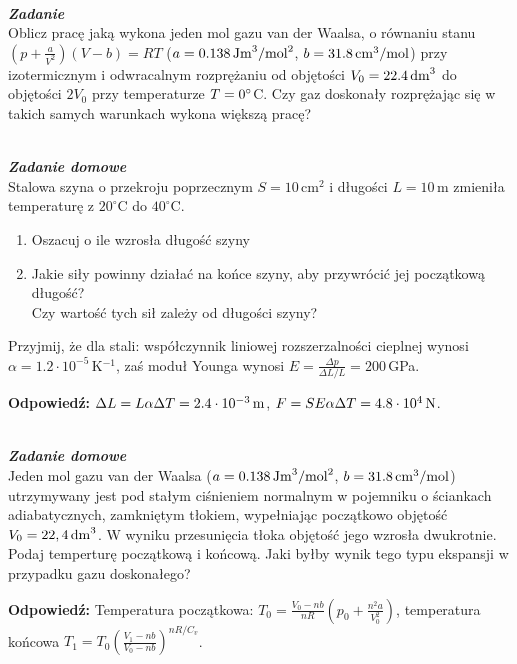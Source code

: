 \documentclass[11pt,a4paper]{article}
\newcounter{zadanie}\newcommand{\zadanie}[1][]{\addtocounter{zadanie}{1} ~\\  {\bf \emph{Zadanie \arabic{zadanie} #1 }} \\}
\newcounter{zaddom}\newcommand{\zaddom}[1][]{\addtocounter{zaddom}{1} ~\\  {\bf \emph{Zadanie domowe \arabic{zaddom} #1 }} \\}
\renewcommand{\t}[1]{\textrm{#1}}
\begin{document}
\vskip 10pt

\zadanie
Oblicz pracę jaką wykona jeden mol gazu van der Waalsa, o równaniu stanu
$(p+\frac{a}{V^2})(V-b)=RT$
($a=0.138\,\rm{Jm}^3/\rm{mol}^2$, $b=31.8\,\rm{cm^3/mol}$)
przy izotermicznym i odwracalnym rozprężaniu od objętości $V_0=22.4\,\rm{dm}^3$
do objętości $2 V_0$ przy temperaturze $T=0\degree$C.
Czy gaz doskonały rozprężając się w takich samych warunkach wykona większą pracę?

\vskip 10pt


\pagebreak
\zaddom
Stalowa szyna o przekroju poprzecznym $S = 10\,$cm$^2$ i długości $L = 10\,$m zmieniła temperaturę
z $20^\circ$C do $40^\circ$C.
\begin{enumerate}
\item Oszacuj o ile wzrosła długość szyny
\item Jakie siły powinny działać na końce szyny, aby przywrócić jej początkową długość? \\
      Czy wartość tych sił zależy od długości szyny?
\end{enumerate}
Przyjmij, że dla stali: współczynnik liniowej rozszerzalności cieplnej wynosi $\alpha = 1.2\cdot 10^{-5}\,$K$^{-1}$,
zaś moduł Younga wynosi $\displaystyle E = \frac{\Delta p}{\Delta L/L} = 200\,$GPa.

\vskip 10pt
\textbf{Odpowiedź:} $\Delta L = L \alpha \Delta T = 2.4 \cdot 10^{-3}\, {\rm m}$, $F = S E \alpha \Delta T = 4.8 \cdot 10^4\, {\rm N}$.

\zaddom
Jeden mol gazu van der Waalsa ($a=0.138\,\rm{Jm}^3/\rm{mol}^2$, $b=31.8\,\rm{cm^3/mol}$)
utrzymywany jest pod stałym ciśnieniem normalnym w pojemniku o ściankach adiabatycznych, zamkniętym tłokiem,
wypełniając początkowo objętość $V_0=22,4\,\rm{dm}^3$.
W wyniku przesunięcia tłoka objętość jego wzrosła dwukrotnie. Podaj temperturę początkową i końcową.  
Jaki byłby wynik tego typu ekspansji w przypadku gazu doskonałego?

\vskip 10pt
\textbf{Odpowiedź:} 
Temperatura początkowa: $T_0 = \frac{V_0-nb}{nR}\left(p_0 + \frac{n^2 a}{V_0^2} \right)$, temperatura końcowa $T_1 = T_0 \left(\frac{V_1 - nb}{V_0 - nb} \right)^{nR/C_v}$. 
\end{document}
